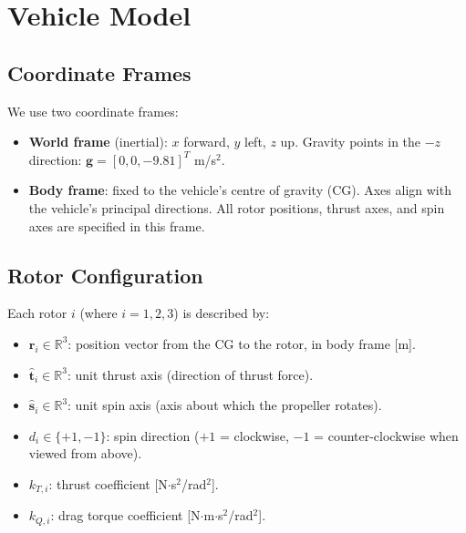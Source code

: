 \documentclass[12pt, a4paper]{article}
\newcommand{\R}{\mathbb{R}}
\begin{document}
\section{Vehicle Model}

\subsection{Coordinate Frames}

We use two coordinate frames:
\begin{itemize}
    \item \textbf{World frame} (inertial): $x$ forward, $y$ left, $z$ up.  Gravity points in the $-z$ direction: $\bm{g} = [0, 0, -9.81]^T$ m/s$^2$.
    \item \textbf{Body frame}: fixed to the vehicle's centre of gravity (CG).  Axes align with the vehicle's principal directions.  All rotor positions, thrust axes, and spin axes are specified in this frame.
\end{itemize}

\subsection{Rotor Configuration}

Each rotor $i$ (where $i = 1, 2, 3$) is described by:
\begin{itemize}
    \item $\bm{r}_i \in \R^3$: position vector from the CG to the rotor, in body frame [m].
    \item $\hat{\bm{t}}_i \in \R^3$: unit thrust axis (direction of thrust force).
    \item $\hat{\bm{s}}_i \in \R^3$: unit spin axis (axis about which the propeller rotates).
    \item $d_i \in \{+1, -1\}$: spin direction ($+1$ = clockwise, $-1$ = counter-clockwise when viewed from above).
    \item $k_{T,i}$: thrust coefficient [N$\cdot$s$^2$/rad$^2$].
    \item $k_{Q,i}$: drag torque coefficient [N$\cdot$m$\cdot$s$^2$/rad$^2$].
\end{itemize}
\end{document}

